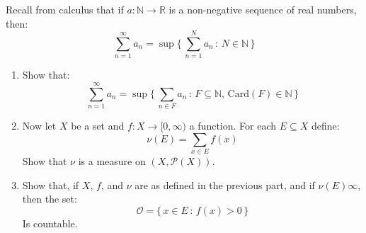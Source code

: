 \documentclass[crop=false,class=article]{standalone}                       %
\begin{document}
    \begin{problem}
        Recall from calculus that if $a:\mathbb{N}\rightarrow\mathbb{R}$
        is a non-negative sequence of real numbers, then:
        \begin{equation}
            \sum_{n=1}^{\infty}a_{n}
            =\sup\Big\{\,\sum_{n=1}^{N}a_{n}\,:\,N\in\mathbb{N}\,\Big\}
        \end{equation}
        \begin{enumerate}
            \item   Show that:
                    \begin{equation}
                        \sum_{n=1}^{\infty}a_{n}
                        =\sup\Big\{\,
                            \sum_{n\in{F}}a_{n}\,:\,
                            F\subseteq\mathbb{N},\,
                            \textrm{Card}(F)\in\mathbb{N}\,
                        \Big\}
                    \end{equation}
            \item   Now let $X$ be a set and $f:X\rightarrow[0,\infty)$
                    a function. For each $E\subseteq{X}$ define:
                    \begin{equation}
                        \nu(E)=\sum_{x\in{E}}f(x)
                    \end{equation}
                    Show that $\nu$ is a measure on $(X,\mathcal{P}(X))$.
            \item   Show that, if $X$, $f$, and $\nu$ are as defined in the
                    previous part, and if $\nu(E)\infty$, then the set:
                    \begin{equation}
                        \mathcal{O}=\{\,x\in{E}\,:\,f(x)>0\,\}
                    \end{equation}
                    Is countable.
        \end{enumerate}
    \end{problem}
\end{document}
